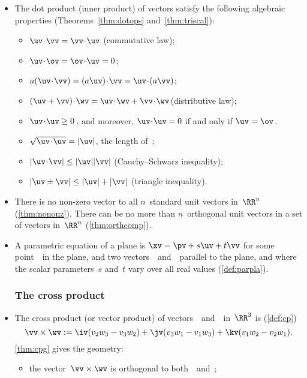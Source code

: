 \begin{itemize}
\item The dot product (inner product) of vectors satisfy the following algebraic properties (Theorems~\ref{thm:dotops} and~\ref{thm:triscal}):
\begin{itemize}
\item \(\uv\cdot\vv=\vv\cdot\uv\) \quad({commutative law});
\item \(\uv\cdot\ov=\ov\cdot\uv=0\);
\item \(a(\uv\cdot\vv)=(a\uv)\cdot\vv=\uv\cdot(a\vv)\);
\item \((\uv+\vv)\cdot\wv=\uv\cdot\wv+\vv\cdot\wv\)\quad({distributive law});
\item \(\uv\cdot\uv\geq0\)\,, and moreover, \(\uv\cdot\uv=0\) if and only if \(\uv=\ov\)\,.
\item \(\sqrt{\uv\cdot\uv}=|\uv|\), the {length} of~\uv;
\item \(|\uv\cdot\vv|\leq|\uv||\vv|\) ({Cauchy--Schwarz inequality});
\item \(|\uv\pm\vv|\leq|\uv|+|\vv|\) ({triangle inequality}).
\end{itemize}

\item There is no non-zero vector  to all \(n\)~{standard unit vector}s in~\(\RR^n\) (\autoref{thm:nononz}).
There can be no more than \(n\)~orthogonal unit vectors in a set of vectors in~\(\RR^n\) (\autoref{thm:orthcomp}).

\item A {parametric equation} of a plane is \(\xv=\pv+s\uv+t\vv\) for some point~\pv\ in the plane, and two vectors~\uv\ and~\vv\  parallel to the plane, and where the {scalar} {parameter}s~\(s\) and~\(t\) vary over all real values (\autoref{def:parpla}).




\subsubsection{The cross product}

\item The {cross product}  (or {vector product}) of vectors~\vv\ and~\wv\ in~\(\RR^3\) is (\autoref{def:cp})
\begin{equation*}
\vv\times\wv:=\iv(v_2w_3-v_3w_2)
+\jv(v_3w_1-v_1w_3)
+\kv(v_1w_2-v_2w_1).
\end{equation*}
\autoref{thm:cpg} gives the geometry:
\begin{itemize}
\item the vector~\(\vv\times\wv\) is {orthogonal} to both~\vv\ and~\wv;


\end{itemize}
\end{itemize}

